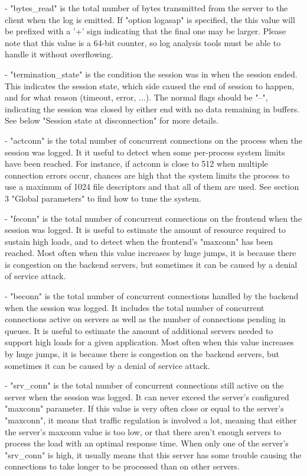   - "bytes_read" is the total number of bytes transmitted from the server to
    the client when the log is emitted. If "option logasap" is specified, the
    this value will be prefixed with a '+' sign indicating that the final one
    may be larger. Please note that this value is a 64-bit counter, so log
    analysis tools must be able to handle it without overflowing.

  - "termination_state" is the condition the session was in when the session
    ended. This indicates the session state, which side caused the end of
    session to happen, and for what reason (timeout, error, ...). The normal
    flags should be "--", indicating the session was closed by either end with
    no data remaining in buffers. See below "Session state at disconnection"
    for more details.

  - "actconn" is the total number of concurrent connections on the process when
    the session was logged. It it useful to detect when some per-process system
    limits have been reached. For instance, if actconn is close to 512 when
    multiple connection errors occur, chances are high that the system limits
    the process to use a maximum of 1024 file descriptors and that all of them
    are used. See section 3 "Global parameters" to find how to tune the system.

  - "feconn" is the total number of concurrent connections on the frontend when
    the session was logged. It is useful to estimate the amount of resource
    required to sustain high loads, and to detect when the frontend's "maxconn"
    has been reached. Most often when this value increases by huge jumps, it is
    because there is congestion on the backend servers, but sometimes it can be
    caused by a denial of service attack.

  - "beconn" is the total number of concurrent connections handled by the
    backend when the session was logged. It includes the total number of
    concurrent connections active on servers as well as the number of
    connections pending in queues. It is useful to estimate the amount of
    additional servers needed to support high loads for a given application.
    Most often when this value increases by huge jumps, it is because there is
    congestion on the backend servers, but sometimes it can be caused by a
    denial of service attack.

  - "srv_conn" is the total number of concurrent connections still active on
    the server when the session was logged. It can never exceed the server's
    configured "maxconn" parameter. If this value is very often close or equal
    to the server's "maxconn", it means that traffic regulation is involved a
    lot, meaning that either the server's maxconn value is too low, or that
    there aren't enough servers to process the load with an optimal response
    time. When only one of the server's "srv_conn" is high, it usually means
    that this server has some trouble causing the connections to take longer to
    be processed than on other servers.

